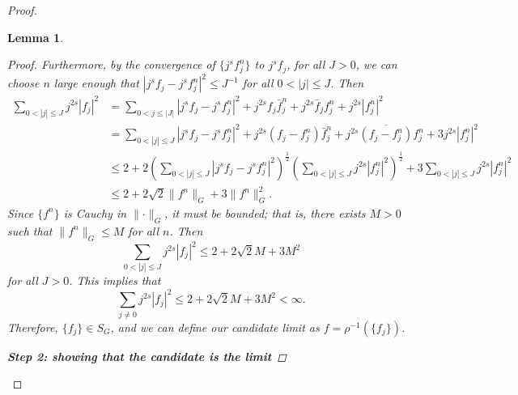 \documentclass{homework}
\newtheorem{lemma}{Lemma}
\begin{document}
\begin{arabicparts}
\begin{proof}
\begin{lemma}
\begin{proof}
				Furthermore, by the convergence of $\{j^sf^n_j\}$ to $j^sf_j$, for all $J > 0$, we can choose $n$ large enough that $|j^sf_j - j^sf^n_j|^2 \le J^{-1}$ for all $0 < |j| \le J$. Then
				\begin{align}
					\sum_{0<|j|\le J}j^{2s}|f_j|^2 &= \sum_{0<j\le |J|}|j^sf_j - j^sf^n_j|^2 + j^{2s}f_j\bar{f}^n_j +j^{2s}\bar{f}_jf^n_j + j^{2s}|f^n_j|^2 \\
					&= \sum_{0<|j|\le J} |j^sf_j - j^sf^n_j|^2 + j^{2s}(f_j-f^n_j)\bar{f}^n_j + j^{2s}\overline{(f_j-f^n_j)}f^n_j + 3j^{2s}|f^n_j|^2\\
					&\le 2 + 2\left(\sum_{0<|j|\le J}|j^sf_j-j^sf^n_j|^2\right)^\frac{1}{2}\left(\sum_{0<|j|\le J}j^{2s}|f^n_j|^2\right)^\frac{1}{2} + 3\sum_{0<|j|\le J}j^{2s}|f^n_j|^2\\
					&\le 2 + 2\sqrt{2}\lVert f^n\rVert_G + 3\lVert f^n\rVert_G^2.
				\end{align}
				Since $\{f^n\}$ is Cauchy in $\lVert\cdot\rVert_G$, it must be bounded; that is, there exists $M > 0$ such that $\lVert f^n\rVert_G \le M$ for all $n$. Then
				\begin{equation}
					\sum_{0<|j|\le J}j^{2s}|f_j|^2 \le 2 + 2\sqrt{2}M + 3M^2
				\end{equation}
				for all $J > 0$. This implies that
				\begin{equation}
					\sum_{j\ne 0}j^{2s}|f_j|^2 \le 2 + 2\sqrt{2}M+3M^2 < \infty.
				\end{equation}
				Therefore, $\{f_j\} \in S_G$, and we can define our candidate limit as $f = \rho^{-1}(\{f_j\})$.
				
				\textbf{Step 2: showing that the candidate is the limit}
				

\end{proof}
\end{lemma}
\end{proof}
\end{arabicparts}
\end{document}
